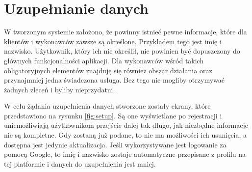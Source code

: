 \section{Uzupełnianie danych}

W tworzonym systemie założono, że powinny istnieć pewne informacje, które dla klientów i wykonawców zawsze są określone. Przykładem tego jest imię i nazwisko. Użytkownik, który ich nie określił, nie powinien być dopuszczony do głównych funkcjonalności aplikacji. Dla wykonawców wśród takich obligatoryjnych elementów znajduję się również obszar działania oraz przynajmniej jedna świadczona usługa. Bez tego nie mogliby otrzymywać żadnych zleceń i byliby nieprzydatni.

W celu żądania uzupełnienia danych stworzone zostały ekrany, które przedstawiono na rysunku \ref{fig:setup}. Są one wyświetlane po rejestracji i uniemożliwiają użytkownikom przejście dalej tak długo, jak niezbędne informacje nie są kompletne. Gdy zostaną już podane, to nie ma możliwości ich usunięcia, a dostępna jest jedynie aktualizacja. Jeśli wykorzystywane jest logowanie za pomocą Google, to imię i nazwisko zostaje automatyczne przepisane z profilu na tej platformie i danych do uzupełnienia jest mniej.

